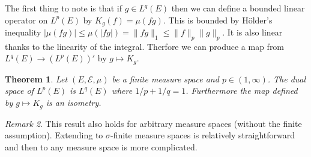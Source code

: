 \documentclass[11pt]{article}
\newtheorem{thm}{Theorem}[section]
\theoremstyle{definition}
\theoremstyle{remark}
\newtheorem{remark}[thm]{Remark}
\begin{document}
The first thing to note is that if $g \in L^q(E)$ then we can define a bounded linear operator on $L^p(E)$ by $K_g(f) = \mu(fg)$. This is bounded by H\"older's inequality $|\mu(fg)| \leq \mu(|fg|) = \|fg\|_1 \leq \|f\|_p \|g\|_p$. It is also linear thanks to the linearity of the integral. Therfore we can produce a map from $L^q(E) \rightarrow (L^p(E))'$ by $g \mapsto K_g$.
\begin{thm}
Let $(E, \mathcal{E}, \mu)$ be a finite measure space and $p \in (1, \infty)$. The dual space of $L^p(E)$ is $L^q(E)$ where $1/p +1/q = 1$. Furthermore the map defined by $g \mapsto K_g$ is an isometry.
\end{thm}
\begin{remark}
This result also holds for arbitrary measure spaces (without the finite assumption). Extending to $\sigma$-finite measure spaces is relatively straightforward and then to any measure space is more complicated.
\end{remark}
\end{document}
